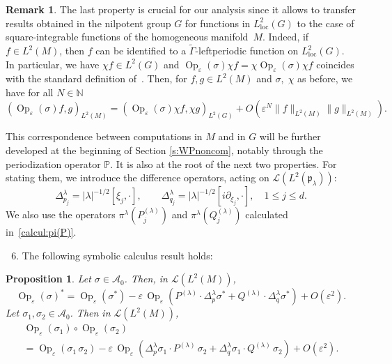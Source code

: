 \documentclass[10pt]{amsart}
\let\mathcal\mathscr
\newcommand{\loc}{\mathrm{loc}}
\DeclareMathOperator{\Op}{Op}
\theoremstyle{plain}
\newtheorem{proposition}[theorem]{Proposition}
\theoremstyle{definition}
\newtheorem{remark}[theorem]{Remark}
\let\eps\varepsilon
\def\N{{\mathbb N}}
\def\bbP{{\mathbb P}}
\begin{document}
\begin{remark}\label{correspGM}
The last property is crucial for our analysis since it allows to transfer results obtained in the nilpotent group $G$ for functions in $L^2_\loc (G)$ to the case of square-integrable functions of the homogeneous manifold~$M$. Indeed, if $f\in L^2(M)$, then $f$ can be identified to a $\widetilde{\Gamma}$-leftperiodic function on $L^2_{\loc}(G)$. In particular, we have $\chi f\in L^2(G)$ and $ \Op_\eps(\sigma) \chi f= \chi \Op_\eps(\sigma) \chi f $ coincides with the standard definition of~\cite{FF1,FF}. Then, for $f,g\in L^2(M)$ and $\sigma,\;\chi$ as before, we have for all $N\in\N$
\begin{equation*}%
\left(\Op_\eps(\sigma) f,g\right)_{L^2(M)} = \left(\Op_\eps(\sigma)\chi f,\chi g\right)_{L^2(G)} +O(\eps^N \| f\|_{L^2(M)}\|g\|_{L^2(M)}).
\end{equation*}
\end{remark}

This correspondence between computations in $M$ and in $G$ will be further developed at the beginning of Section \ref{s:WPnoncom}, notably through the periodization operator $\bbP$. It is also at the root of the next two properties. For stating them, we introduce the difference operators, acting on ${\mathcal L}(L^2(\mathfrak p_\lambda))$:
\[
\Delta_{p_j}^{\lambda}= |\lambda|^{-1/2}[\xi_j, \cdot ],
\qquad
\Delta_{q_j}^{\lambda} = |\lambda|^{-1/2}[i\partial_{\xi_j}, \cdot],
\quad 1\leq j\leq d.
\]
We also use the operators $\pi^\lambda(P^{(\lambda)}_j)$ and $\pi^\lambda(Q^{(\lambda)}_j)$ calculated in~\eqref{calcul:pi(P)}.

\begin{enumerate}\setcounter{enumi}{5}
\item\label{fact:6} The following symbolic calculus result holds:
\end{enumerate}

\begin{proposition}\label{prop:symbcal}
Let $\sigma\in {\mathcal A}_0$. Then, in ${\mathcal L}(L^2(M))$,
\begin{equation}\label{adjoint}
\Op_\eps(\sigma)^*= \Op_\eps (\sigma^*) -{\eps} \,\Op_\eps(P^{(\lambda)}\cdot \Delta^\lambda_p \sigma^*+Q^{(\lambda)}\cdot \Delta^\lambda_q \sigma^*)+O(\eps^2).
\end{equation}
Let $\sigma_1,\sigma_2 \in {\mathcal A}_0$. Then in ${\mathcal L}(L^2(M))$,
\begin{multline}\label{composition}
\Op_\eps(\sigma_1)\circ \Op_\eps(\sigma_2)\\
= \Op_\eps(\sigma_1\,\sigma_2) -\eps\, \Op_\eps\left(\Delta_p^\lambda \sigma_1 \cdot P^{(\lambda)}\,\sigma_2+\Delta^\lambda_q \sigma_1 \cdot Q^{(\lambda)}\, \sigma_2\right)+O(\eps^2).
\end{multline}
\end{proposition}
\end{document}
